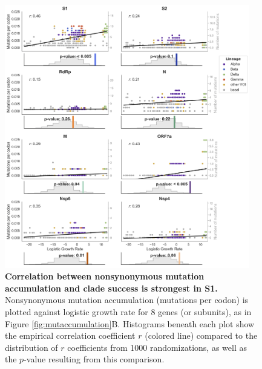 \documentclass[11pt,oneside,letterpaper]{article}
\begin{document}
\begin{figure}[h!]
\centerline{\includegraphics[width=0.95\textwidth]{fig1_supp_mutaccummoregenes.png}}
\caption{\textbf{Correlation between nonsynonymous mutation accumulation and clade success is strongest in S1.}
Nonsynonymous mutation accumulation (mutations per codon) is plotted against logistic growth rate for 8 genes (or subunits), as in Figure \ref{fig:mutaccumulation}B. Histograms beneath each plot show the empirical correlation coefficient $r$ (colored line) compared to the distribution of $r$ coefficients from 1000 randomizations, as well as the $p$-value resulting from this comparison.
}
\label{fig:mutaccummoregenes}
\end{figure}
\end{document}
